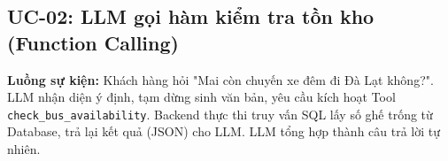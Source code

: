 \subsection{UC-02: LLM gọi hàm kiểm tra tồn kho (Function Calling)}
\textbf{Luồng sự kiện:} Khách hàng hỏi "Mai còn chuyến xe đêm đi Đà Lạt không?". LLM nhận diện ý định, tạm dừng sinh văn bản, yêu cầu kích hoạt Tool \texttt{check\_bus\_availability}. Backend thực thi truy vấn SQL lấy số ghế trống từ Database, trả lại kết quả (JSON) cho LLM. LLM tổng hợp thành câu trả lời tự nhiên.
